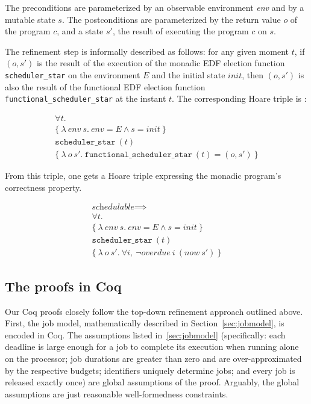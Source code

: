 	The preconditions are parameterized by an observable environment \emph{env} and by a mutable state $s$. The postconditions are parameterized by the return value $o$ of the program $c$, and a state $s'$, the result of executing the program $c$ on $s$.

	The refinement step is informally described as follows: for any given moment $t$, if $(o, s')$ is the result of the execution of the monadic EDF election function \texttt{scheduler\_star} on the environment $E$ and the initial state $init$, then $(o, s')$ is also the result of the functional EDF election function \texttt{functional\_scheduler\_star} at the instant $t$. The corresponding Hoare triple is :

	\begin{gather*}
		\forall t.\\
		\{
		~\lambda~\textit{env}~s. ~\textit{env} = E \land s = \textit{init}~
		\}\\
		\texttt{scheduler\_star}~(t)\\
		\{
		~\lambda~o~s'. ~\texttt{functional\_scheduler\_star}~(t) = (o,s')~
		\}
	\end{gather*}

	From this triple, one gets a Hoare triple expressing the monadic program's correctness property.

	\begin{gather*}
		\textit{schedulable} \implies\\
		\forall t.\\
		\{
		~\lambda~\textit{env}~s. ~\textit{env} = E \land s = \textit{init}~
		\}\\
		\texttt{scheduler\_star}~(t)\\
		\{
		~\lambda~o~s'. ~\forall i,~\neg \textit{overdue}~i~(\textit{now}~s') ~
		\}
	\end{gather*}


	\subsection{The proofs in Coq}
	Our Coq proofs closely follow the top-down refinement approach outlined above. First, the job model, mathematically described in Section~\ref{sec:jobmodel}, is encoded in Coq. The assumptions listed in~\ref{sec:jobmodel} (specifically: each deadline is large enough for a job to complete its execution when running alone on the processor; job durations are greater than zero and are over-approximated by the respective budgets; identifiers uniquely determine jobs; and every job is released exactly once) are global assumptions of the proof. Arguably, the global assumptions are just reasonable well-formedness constraints.



